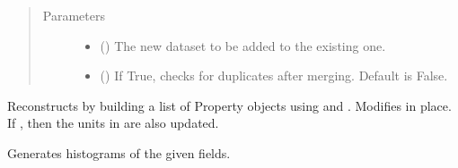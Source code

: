 \documentclass[letterpaper,10pt,english]{sphinxmanual}
\begin{document}
\begin{fulllineitems}
\begin{fulllineitems}
\begin{description}
\end{description}
\begin{quote}\begin{description}
\item[{Parameters}] \leavevmode\begin{itemize}
\item {} 
\sphinxAtStartPar
{} ({\hyperref[\detokenize{dataset:colabfit.tools.dataset.Dataset}]{}}) \textendash{} The new dataset to be added to the existing one.

\item {} 
\sphinxAtStartPar
{} () \textendash{} If True, checks for duplicates after merging. Default is False.

\end{itemize}

\end{description}\end{quote}

\end{fulllineitems}


\begin{fulllineitems}
\label{\detokenize{dataset:colabfit.tools.dataset.Dataset.parse_data}}
\sphinxAtStartPar
Re\sphinxhyphen{}constructs  by building a list of Property objects using
 and . Modifies  in
place. If , then the units in 
are also updated.

\end{fulllineitems}


\begin{fulllineitems}
\label{\detokenize{dataset:colabfit.tools.dataset.Dataset.plot_histograms}}
\sphinxAtStartPar
Generates histograms of the given fields.


\end{fulllineitems}
\end{fulllineitems}
\end{document}
